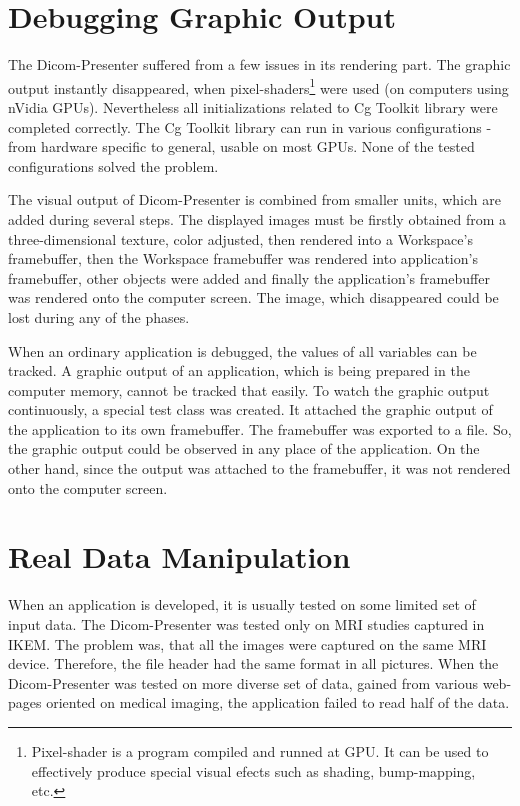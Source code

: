 \section{Debugging Graphic Output}
\label{dgo}
The Dicom-Presenter suffered from a few issues in its rendering part. The graphic output instantly disappeared, when pixel-shaders\footnote{Pixel-shader is a program compiled and runned at GPU. It can be used to effectively produce special visual efects such as shading, bump-mapping, etc.} were used (on computers using nVidia GPUs). Nevertheless all initializations related to Cg Toolkit library were completed correctly. The Cg Toolkit library can run in various configurations - from hardware specific to general, usable on most GPUs. None of the tested configurations solved the problem.

The visual output of Dicom-Presenter is combined from smaller units, which are added during several steps. The displayed images must be firstly obtained from a three-dimensional texture, color adjusted, then rendered into a Workspace's framebuffer, then the Workspace framebuffer was rendered into application's framebuffer, other objects were added and finally the application's framebuffer was rendered onto the computer screen. The image, which disappeared could be lost during any of the phases.

When an ordinary application is debugged, the values of all variables can be tracked. A graphic output of an application, which is being prepared in the computer memory, cannot be tracked that easily. To watch the graphic output continuously, a special test class was created. It attached the graphic output of the application to its own framebuffer. The framebuffer was exported to a file. So, the graphic output could be observed in any place of the application. On the other hand, since the output was attached to the framebuffer, it was not rendered onto the computer screen.

\section{Real Data Manipulation}
When an application is developed, it is usually tested on some limited set of input data. The Dicom-Presenter was tested only on MRI studies captured in IKEM. The problem was, that all the images were captured on the same MRI device. Therefore, the file header had the same format in all pictures. When the Dicom-Presenter was tested on more diverse set of data, gained from various web-pages oriented on medical imaging, the application failed to read half of the data.

